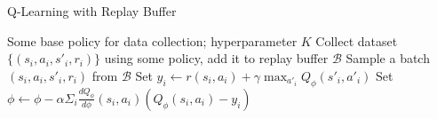 \begin{algorithm}[t!]
\caption{Q-Learning with Replay Buffer}
\begin{algorithmic}[1]
\label{alg:QwRB}
\REQUIRE Some base policy for data collection; hyperparameter $K$
    \STATE Collect dataset $\{(s_i,a_i,s'_i,r_i)\}$ using some policy, add it to replay buffer $\mathcal{B}$
        \STATE Sample a batch $(s_i,a_i,s'_i,r_i)$ from $\mathcal{B}$
        \STATE Set $y_i\leftarrow r(s_i,a_i) + \gamma \max_{a'_i}Q_\phi(s'_i,a'_i)$
        \STATE Set $\phi \leftarrow \phi-\alpha\Sigma_i\frac{dQ_\phi}{d\phi}(s_i,a_i)(Q_\phi(s_i,a_i) - y_i)$
    \ENDFOR
\ENDWHILE
\end{algorithmic}
\end{algorithm}